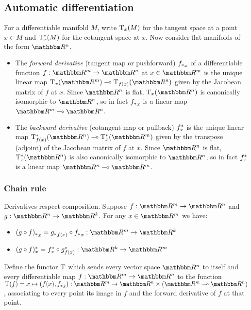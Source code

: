 \subsection{Automatic differentiation}

For a differentiable manifold $M$, write $\mathrm{T}_x(M)$ for the tangent space at a point $x \in M$ and
$\mathrm{T}^*_x(M)$ for the cotangent space at $x$. Now consider flat manifolds of the form $\RR^n$.

\begin{itemize}
\item The \emph{forward derivative} (tangent map or pushforward) ${f_{*}}_x$ of a differentiable function
$f: \RR^m \to \RR^n$ at $x \in \RR^m$ is the unique linear map $\tangents_x(\RR^m) \linearto
\tangents_{f(x)}(\RR^n)$ given by the Jacobean matrix of $f$ at $x$. Since $\RR^n$ is flat,
$\tangents_x(\RR^n)$ is canonically isomorphic to $\RR^n$, so in fact ${f_{*}}_x$ is a linear map $\RR^m
\linearto \RR^n$.
\item The \emph{backward derivative} (cotangent map or pullback) $f^{*}_x$ is the unique linear map
$\cotangents_{f(x)}(\RR^n) \linearto \cotangents_x(\RR^m)$ given by the transpose (adjoint) of the Jacobean
matrix of $f$ at $x$. Since $\RR^n$ is flat, $\cotangents_x(\RR^n)$ is also canonically isomorphic to $\RR^n$,
so in fact $f^{*}_x$ is a linear map $\RR^n \linearto \RR^m$.
\end{itemize}

\subsubsection{Chain rule}

Derivatives respect composition. Suppose $f: \RR^m \to \RR^n$ and $g: \RR^n \to \RR^k$. For any $x \in \RR^m$
we have:

\begin{itemize}
\item $\pushf{(g \comp f)}_x = \pushf{g}_{f(x)} \comp \pushf{f}_x: \RR^m \to \RR^k$
\item $\pullf{(g \comp f)}_x = \pullf{f}_{x} \comp \pullf{g}_{f(x)}: \RR^k \to \RR^m$
\end{itemize}

\begin{definition}
Define the functor $\mathrm{T}$ which sends every vector space $\RR^n$ to itself and every differentiable map
$f: \RR^m \to \RR^n$ to the function $\tangents(f) = x \mapsto (f(x), \pushf{f}_x): \RR^m \to \RR^n \times
(\RR^m \linearto \RR^n)$, associating to every point its image in $f$ and the forward derivative of $f$ at
that point.
\end{definition}

